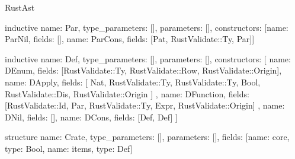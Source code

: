 \begin{lexlean}{RustAst}
\begin{semanticmodule}
inductive{
  name: Par,
  type_parameters: [],
  parameters: [],
  constructors: [{name: ParNil, fields: []}, {name: ParCons, fields: [Pat, RustValidate::Ty, Par]}]
}

inductive{
  name: Def,
  type_parameters: [],
  parameters: [],
  constructors: [
    {name: DEnum, fields: [RustValidate::Ty, RustValidate::Row, RustValidate::Origin]},
    {
      name: DApply,
      fields: [
        Nat,
        RustValidate::Ty,
        RustValidate::Ty,
        Bool,
        RustValidate::Dis,
        RustValidate::Origin
      ]
    },
    {
      name: DFunction,
      fields: [RustValidate::Id, Par, RustValidate::Ty, Expr, RustValidate::Origin]
    },
    {name: DNil, fields: []},
    {name: DCons, fields: [Def, Def]}
  ]
}

structure{
  name: Crate,
  type_parameters: [],
  parameters: [],
  fields: [{name: core, type: Bool}, {name: items, type: Def}]
}
\end{semanticmodule}
\end{lexlean}
